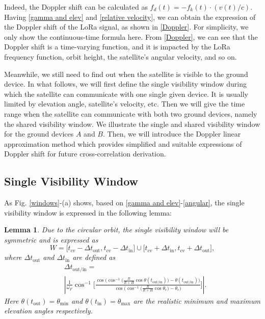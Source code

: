 \documentclass{IEEEtaes}
\theoremstyle{plain}
\newtheorem{lemma}{Lemma}
\begin{document}
Indeed, the Doppler shift can be calculated as $f_d(t)=-f_k(t) \cdot(v(t)/c)$. Having \eqref{gamma and elev} and \eqref{relative velocity}, we can obtain the expression of the Doppler shift of the LoRa signal, as shown in \eqref{Doppler}. For simplicity, we only show the continuous-time formula here. From \eqref{Doppler}, we can see that the Doppler shift is a time-varying function, and it is impacted by the LoRa frequency function, orbit height, the satellite's angular velocity, and so on.

Meanwhile, we still need to find out when the satellite is visible to the ground device. In what follows, we will first define the single visibility window during which the satellite can communicate with one single given device. It is usually limited by elevation angle, satellite's velocity, etc. Then we will give the time range when the satellite can communicate with both two ground devices, namely the shared visibility window. We illustrate the single and shared visibility window for the ground devices $A$ and $B$. Then, we will introduce the Doppler linear approximation method which provides simplified and suitable expressions of Doppler shift for future cross-correlation derivation.

\subsection{Single Visibility Window}
As Fig. \ref{windows}-(a) shows, based on \eqref{gamma and elev}-\eqref{angular}, the single visibility window is expressed in the following lemma: 
\begin{lemma}\label{lemma1}
Due to the circular orbit, the single visibility window will be symmetric and is expressed as
\begin{equation}
  \label{single window}
  W = \big[t_{c\!v}-\Delta t_{\text{out}},t_{c\!v}-\Delta t_{\text{in}}\big]\cup \big[t_{c\!v}+\Delta t_{\text{in}},t_{c\!v}+\Delta t_{\text{out}}\big],
\end{equation}
where $\Delta t_{\text{out}}$ and $\Delta t_{\text{in}}$ are defined as
\begin{equation}
  \label{singlecalculation}
  \begin{aligned}
  &\Delta t_{\text{out/in}} = \\
  &\left | \frac{1}{\omega_F}\cos^{-1}\Big[\frac{\cos\Big(\cos^{-1}\big (\frac{R}{R+H}\cos\theta(t_{\text{out/in}})\big)-\theta(t_{\text{out/in}})\Big)}{\cos\Big(\cos^{-1}\big (\frac{R}{R+H}\cos\theta_c\big)-\theta_c\Big)}\Big] \right |.
  \end{aligned}
\end{equation}
Here $\theta(t_{\text{out}}) = \theta_{\min}$ and $\theta(t_{\text{in}}) = \theta_{\max}$ are the realistic minimum and maximum elevation angles respectively. 
\end{lemma}
\end{document}
